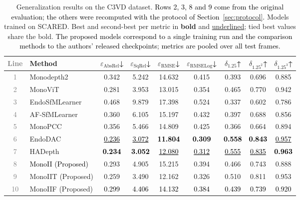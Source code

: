 \documentclass[a4paper,fleqn]{cas-dc}
\begin{document}
{\begin{table}[h]
\centering
\begin{tabular}{clccccccc}
\toprule
\textcolor{gray}{Line} & Method & $\varepsilon_\text{AbsRel}$↓ & 
        $\varepsilon_\text{SqRel}$↓ & 
        $\varepsilon_\text{RMSE}$↓ & 
        $\varepsilon_\text{RMSELog}$↓ & 
        $\delta_{1.25}$↑ & $\delta_{1.25^2}$↑ & 
        $\delta_{1.25^3}$↑ \\
\midrule
\textcolor{gray}{1} &Monodepth2     & 0.342 & 5.242 & 14.632 & 0.415 & 0.393 & 0.696 & 0.885 \\
\textcolor{gray}{2} &MonoViT        & 0.281 & 3.953 & 13.015 & 0.354 & 0.465 & 0.770 & 0.942 \\
\textcolor{gray}{3} &EndoSfMLearner & 0.468 & 9.879 & 17.398 & 0.524 & 0.337 & 0.602 & 0.786 \\
\textcolor{gray}{4} &AF-SfMLearner  & 0.360 & 6.105 & 15.197 & 0.432 & 0.397 & 0.688 & 0.856 \\
\textcolor{gray}{5} &MonoPCC        & 0.356 & 5.466 & 14.809 & 0.425 & 0.366 & 0.664 & 0.894 \\
\textcolor{gray}{6} &EndoDAC        & \textcolor{black}{\underline{0.236}} & \textcolor{black}{\underline{3.072}} & \textcolor{black}{\textbf{11.804}} & \textcolor{black}{\textbf{0.309}} & \textcolor{black}{\textbf{0.558}} & \textcolor{black}{\textbf{0.843}} & \textcolor{black}{\underline{0.957}} \\
\textcolor{gray}{7} &HADepth        & \textcolor{black}{\textbf{0.234}} & \textcolor{black}{\textbf{3.052}} & \textcolor{black}{\underline{12.080}} & \textcolor{black}{\underline{0.312}} & \textcolor{black}{\underline{0.555}} & \textcolor{black}{\underline{0.835}} & \textcolor{black}{\textbf{0.963}} \\
\midrule
\textcolor{gray}{8} & \textcolor{black}{MonoII (Proposed)} & 0.293 & 4.905 & 15.215 & 0.394 & 0.466 & 0.743 & 0.888 \\
\textcolor{gray}{9} &MonoIIT (Proposed) & 0.259 & 3.490 & 12.162 & 0.326 & 0.510 & 0.811 & 0.953 \\
\textcolor{gray}{10} &MonoIIF (Proposed) & \textcolor{black}{0.299} & \textcolor{black}{4.406} & \textcolor{black}{14.132} & \textcolor{black}{0.384} & \textcolor{black}{0.439} & \textcolor{black}{0.739} & \textcolor{black}{0.920} \\
\bottomrule
\end{tabular}
\caption{Generalization results on the C3VD dataset. \textcolor{black}{Rows 2, 3, 8 and 9 come from the original evaluation; the others were recomputed with the protocol of Section~\ref{sec:protocol}.} 
Models trained on SCARED. Best and second-best 
per metric in \textbf{bold} and \underline{underlined}; tied best values share the bold. \textcolor{black}{The proposed models correspond to a single training run and the comparison methods to the authors' released checkpoints; metrics are pooled over all test frames.}}
\label{tab:quant_c3vd}
\end{table}

}
\end{document}

